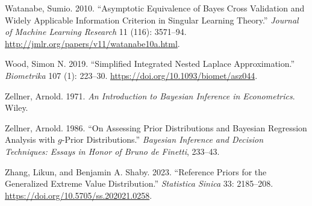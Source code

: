 \documentclass[
  11pt,
  letterpaper,
]{scrbook}
\newlength{\cslhangindent}
\newenvironment{CSLReferences}[2] %
 {\begin{list}{}{%
  \setlength{\itemindent}{0pt}
  \setlength{\leftmargin}{0pt}
  \setlength{\parsep}{0pt}
  \ifodd #1
   \setlength{\leftmargin}{\cslhangindent}
   \setlength{\itemindent}{-1\cslhangindent}
  \fi
  \setlength{\itemsep}{#2\baselineskip}}}
 {\end{list}}
\theoremstyle{definition}
\theoremstyle{plain}
\theoremstyle{plain}
\theoremstyle{plain}
\theoremstyle{definition}
\theoremstyle{definition}
\theoremstyle{plain}
\theoremstyle{plain}
\theoremstyle{remark}
\begin{document}
\begin{CSLReferences}{1}{1}
Watanabe, Sumio. 2010. {``Asymptotic Equivalence of {B}ayes Cross
Validation and Widely Applicable Information Criterion in Singular
Learning Theory.''} \emph{Journal of Machine Learning Research} 11
(116): 3571--94. \url{http://jmlr.org/papers/v11/watanabe10a.html}.

Wood, Simon N. 2019. {``Simplified Integrated Nested {L}aplace
Approximation.''} \emph{Biometrika} 107 (1): 223--30.
\url{https://doi.org/10.1093/biomet/asz044}.

Zellner, Arnold. 1971. \emph{An Introduction to {B}ayesian Inference in
Econometrics}. Wiley.

Zellner, Arnold. 1986. {``On Assessing Prior Distributions and
{B}ayesian Regression Analysis with \(g\)-Prior Distributions.''}
\emph{{B}ayesian Inference and Decision Techniques: Essays in Honor of
{B}runo de {F}inetti}, 233--43.

Zhang, Likun, and Benjamin A. Shaby. 2023. {``Reference Priors for the
Generalized Extreme Value Distribution.''} \emph{Statistica Sinica} 33:
2185--208. \url{https://doi.org/10.5705/ss.202021.0258}.

\end{CSLReferences}


\backmatter
\end{document}
